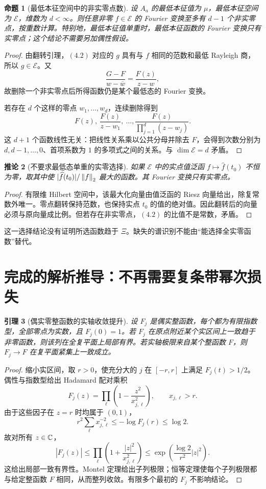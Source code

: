\documentclass[UTF8,fontset=none,11pt,a4paper]{ctexart}
\newtheorem{prop}{命题}[section]
\newtheorem{lemma}[prop]{引理}
\newtheorem{cor}[prop]{推论}
\begin{document}
\begin{prop}[最低本征空间中的非实零点数]
设 $A_a$ 的最低本征值为 $\mu$，最低本征空间为 $\mathcal E$，维数为 $d<\infty$。则任意非零 $f\in\mathcal E$ 的 Fourier 变换至多有 $d-1$ 个非实零点，按重数计算。特别地，最低本征值单重时，最低本征函数的 Fourier 变换只有实零点；这个结论不需要另加偶性假设。
\end{prop}
\begin{proof}
由翻转引理，$(4.2)$ 对应的 $g$ 具有与 $f$ 相同的范数和最低 Rayleigh 商，所以 $g\in\mathcal E$。又
\[
 \frac{G-F}{w-\overline w}=\frac{F(z)}{z-w},
\]
故删除一个非实零点后所得函数仍是某个最低态的 Fourier 变换。

若存在 $d$ 个这样的零点 $w_1,\ldots,w_d$，连续删除得到
\[
 F(z),\ \frac{F(z)}{z-w_1},\ \ldots,
 \frac{F(z)}{\prod_{j=1}^{d}(z-w_j)}.
\]
这 $d+1$ 个函数线性无关：把线性关系乘以公共分母并除去 $F$，会得到次数分别为 $d,d-1,\ldots,0$、首项系数为 $1$ 的多项式之间的关系。与 $\dim\mathcal E=d$ 矛盾。
\end{proof}

\begin{cor}[不要求最低态单重的实零选择]
如果 $\mathcal E$ 中的实点值泛函 $f\mapsto\widehat f(t_0)$ 不恒为零，取其中使 $|\widehat f(t_0)|/\left\lVert f\right\rVert_2$ 最大的函数。其 Fourier 变换只有实零点。
\end{cor}
\begin{proof}
有限维 Hilbert 空间中，该最大化向量由值泛函的 Riesz 向量给出，除复常数外唯一。零点翻转保持范数，也保持实点 $t_0$ 的值的绝对值。因此翻转后的向量必须与原向量成比例。但若存在非实零点，$(4.2)$ 的比值不是常数，矛盾。
\end{proof}

这一选择结论没有证明所选函数趋于 $\Xi$。缺失的谱识别不能由“能选择全实零函数”替代。

\section{完成的解析推导：不再需要复条带幂次损失}
\begin{lemma}[偶实零整函数的实轴收敛提升]
设 $F_j$ 是偶实整函数，每个都为有限指数型，全部零点为实数，且 $F_j(0)=1$。若 $F_j$ 在原点附近某个实区间上一致趋于非零函数，则该列在全复平面上局部有界。若实轴极限来自某个整函数 $F$，则 $F_j\to F$ 在复平面紧集上一致成立。
\end{lemma}
\begin{proof}
缩小实区间，取 $r>0$，使充分大的 $j$ 在 $[-r,r]$ 上满足 $F_j(t)>1/2$。偶性与指数型给出 Hadamard 配对乘积
\[
 F_j(z)=\prod_{\ell}\left(1-\frac{z^2}{x_{j,\ell}^2}\right),
 \qquad x_{j,\ell}>r.
\]
由于这些因子在 $z=r$ 时均属于 $(0,1)$，
\[
 r^2\sum_\ell x_{j,\ell}^{-2}
 \le -\log F_j(r)\le\log2.
\]
故对所有 $z\in\mathbb C$，
\[
 |F_j(z)|\le\prod_\ell\left(1+\frac{|z|^2}{x_{j,\ell}^2}\right)
 \le\exp\!\left(\frac{\log2}{r^2}|z|^2\right). \tag{5.1}
\]
这给出局部一致有界性。Montel 定理给出子列极限；恒等定理使每个子列极限都与给定整函数 $F$ 相同，从而整列收敛。有限多个最初的 $F_j$ 不影响结论。
\end{proof}
\end{document}
